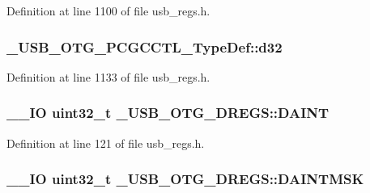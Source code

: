 Definition at line 1100 of file usb\-\_\-regs.\-h.

\hypertarget{group___u_s_b___o_t_g___d_r_i_v_e_r_ga2e1fd814ad3ab867005461a0766b0ae4}{
\subsubsection[{d32}]{ \-\_\-\-U\-S\-B\-\_\-\-O\-T\-G\-\_\-\-P\-C\-G\-C\-C\-T\-L\-\_\-\-Type\-Def\-::d32}}\label{group___u_s_b___o_t_g___d_r_i_v_e_r_ga2e1fd814ad3ab867005461a0766b0ae4}


Definition at line 1133 of file usb\-\_\-regs.\-h.

\hypertarget{group___u_s_b___o_t_g___d_r_i_v_e_r_gab6955618198becc31d1621906c42389c}{
\subsubsection[{D\-A\-I\-N\-T}]{\setlength{\rightskip}{0pt plus 5cm}\-\_\-\-\_\-\-I\-O {\bf uint32\-\_\-t} \-\_\-\-U\-S\-B\-\_\-\-O\-T\-G\-\_\-\-D\-R\-E\-G\-S\-::\-D\-A\-I\-N\-T}}\label{group___u_s_b___o_t_g___d_r_i_v_e_r_gab6955618198becc31d1621906c42389c}


Definition at line 121 of file usb\-\_\-regs.\-h.

\hypertarget{group___u_s_b___o_t_g___d_r_i_v_e_r_gaea0f7408d7142abdd751cd825b350a4f}{
\subsubsection[{D\-A\-I\-N\-T\-M\-S\-K}]{\setlength{\rightskip}{0pt plus 5cm}\-\_\-\-\_\-\-I\-O {\bf uint32\-\_\-t} \-\_\-\-U\-S\-B\-\_\-\-O\-T\-G\-\_\-\-D\-R\-E\-G\-S\-::\-D\-A\-I\-N\-T\-M\-S\-K}}\label{group___u_s_b___o_t_g___d_r_i_v_e_r_gaea0f7408d7142abdd751cd825b350a4f}


